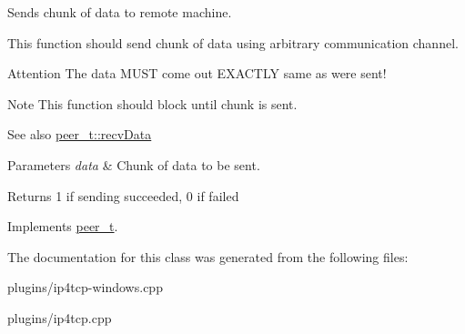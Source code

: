\-Sends chunk of data to remote machine. 

\-This function should send chunk of data using arbitrary communication channel. \begin{DoxyAttention}{\-Attention}
\-The data \-M\-U\-S\-T come out \-E\-X\-A\-C\-T\-L\-Y same as were sent! 
\end{DoxyAttention}
\begin{DoxyNote}{\-Note}
\-This function should block until chunk is sent. 
\end{DoxyNote}
\begin{DoxySeeAlso}{\-See also}
\hyperlink{classpeer__t_af0dec938065477f8b131e0d5a7c09513}{peer\-\_\-t\-::recv\-Data} 
\end{DoxySeeAlso}

\begin{DoxyParams}{\-Parameters}
{\em data} & \-Chunk of data to be sent. \\
\hline
\end{DoxyParams}
\begin{DoxyReturn}{\-Returns}
1 if sending succeeded, 0 if failed 
\end{DoxyReturn}


\-Implements \hyperlink{classpeer__t_a42902fbacfebd9773f4f7ad3527382be}{peer\-\_\-t}.



\-The documentation for this class was generated from the following files\-:\begin{DoxyCompactItemize}
\item 
plugins/ip4tcp-\/windows.\-cpp\item 
plugins/ip4tcp.\-cpp\end{DoxyCompactItemize}
